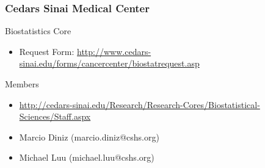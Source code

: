 \documentclass[10pt]{beamer}
\begin{document}
\begin{frame}
\frametitle{Cedars Sinai Medical Center}
\begin{block}{Biostatistics Core}
\begin{itemize}
\item Request Form: \url{http://www.cedars-sinai.edu/forms/cancercenter/biostatrequest.asp}
\end{itemize}
\end{block}
\begin{block}{Members}
\begin{itemize}
\item \url{http://cedars-sinai.edu/Research/Research-Cores/Biostatistical-Sciences/Staff.aspx}
\item Marcio Diniz (marcio.diniz@cshs.org)
\item Michael Luu (michael.luu@cshs.org)
\end{itemize}
\end{block}
\end{frame}
\end{document}
